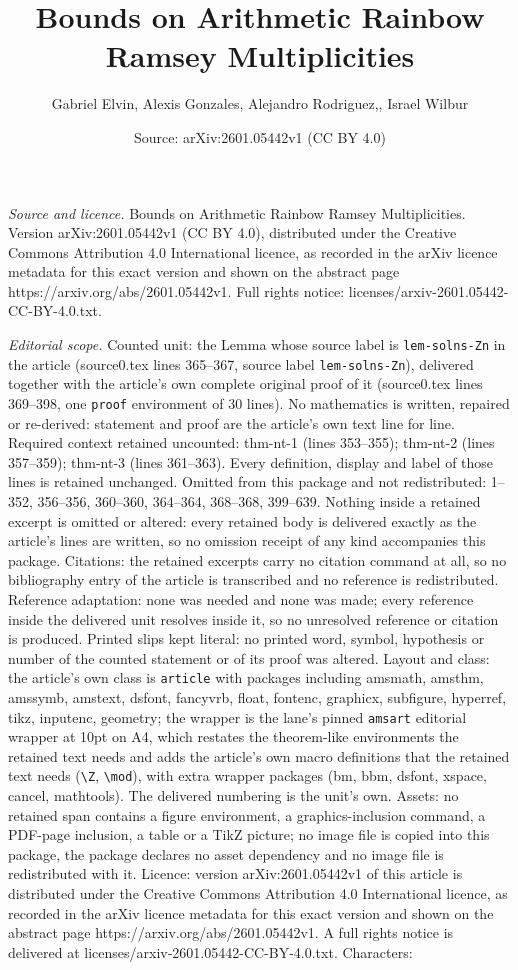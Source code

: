 \documentclass[10pt,a4paper]{amsart}
\title[Bounds on Arithmetic Rainbow Ramsey Multiplicities]{Bounds on Arithmetic Rainbow Ramsey Multiplicities}
\author{Gabriel Elvin, Alexis Gonzales, Alejandro Rodriguez,, Israel Wilbur}
\date{Source: arXiv:2601.05442v1 (CC BY 4.0)}
\begin{document}
\maketitle

\noindent\emph{Source and licence.} Bounds on Arithmetic Rainbow Ramsey Multiplicities. Version arXiv:2601.05442v1 (CC BY 4.0), distributed under the Creative Commons Attribution 4.0 International licence, as recorded in the arXiv licence metadata for this exact version and shown on the abstract page https://arxiv.org/abs/2601.05442v1. Full rights notice: licenses/arxiv-2601.05442-CC-BY-4.0.txt.\par\smallskip

\noindent\textit{Editorial scope.} Counted unit: the Lemma whose source label is \texttt{lem-solns-Zn} in the article (source0.tex lines 365--367, source label \texttt{lem-solns-Zn}), delivered together with the article's own complete original proof of it (source0.tex lines 369--398, one \texttt{proof} environment of 30 lines). No mathematics is written, repaired or re-derived: statement and proof are the article's own text line for line. Required context retained uncounted: thm-nt-1 (lines 353--355); thm-nt-2 (lines 357--359); thm-nt-3 (lines 361--363). Every definition, display and label of those lines is retained unchanged. Omitted from this package and not redistributed: 1--352, 356--356, 360--360, 364--364, 368--368, 399--639. Nothing inside a retained excerpt is omitted or altered: every retained body is delivered exactly as the article's lines are written, so no omission receipt of any kind accompanies this package. Citations: the retained excerpts carry no citation command at all, so no bibliography entry of the article is transcribed and no reference is redistributed. Reference adaptation: none was needed and none was made; every reference inside the delivered unit resolves inside it, so no unresolved reference or citation is produced. Printed slips kept literal: no printed word, symbol, hypothesis or number of the counted statement or of its proof was altered. Layout and class: the article's own class is \texttt{article} with packages including amsmath, amsthm, amssymb, amstext, dsfont, fancyvrb, float, fontenc, graphicx, subfigure, hyperref, tikz, inputenc, geometry; the wrapper is the lane's pinned \texttt{amsart} editorial wrapper at 10pt on A4, which restates the theorem-like environments the retained text needs and adds the article's own macro definitions that the retained text needs (\texttt{\textbackslash Z}, \texttt{\textbackslash mod}), with extra wrapper packages (bm, bbm, dsfont, xspace, cancel, mathtools). The delivered numbering is the unit's own. Assets: no retained span contains a figure environment, a graphics-inclusion command, a PDF-page inclusion, a table or a TikZ picture; no image file is copied into this package, the package declares no asset dependency and no image file is redistributed with it. Licence: version arXiv:2601.05442v1 of this article is distributed under the Creative Commons Attribution 4.0 International licence, as recorded in the arXiv licence metadata for this exact version and shown on the abstract page https://arxiv.org/abs/2601.05442v1. A full rights notice is delivered at licenses/arxiv-2601.05442-CC-BY-4.0.txt. Characters: 
\end{document}
